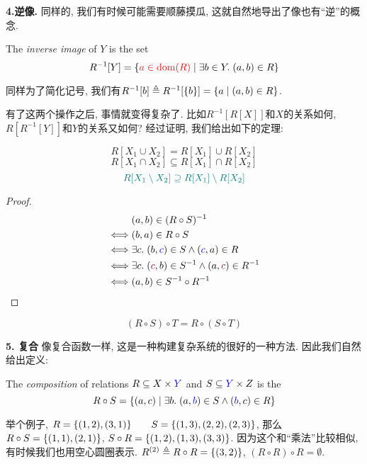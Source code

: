 \textbf{4.逆像. } 同样的, 我们有时候可能需要顺藤摸瓜, 这就自然地导出了像也有``逆''的概念. 

\begin{definition}
  The {\it inverse image} of $Y$  is the set
  \[
    R^{-1}[Y] = \{\textcolor{red}{a \in \text{dom}(R)} \mid \exists b \in Y.\; (a, b) \in R\}
  \]
\end{definition}
同样为了简化记号, 我们有$R^{-1}[b] \triangleq R^{-1}[\{b\}] = \{a \mid (a, b) \in R\}$. 

有了这两个操作之后, 事情就变得复杂了. 比如$R^{-1}[R[X]] $和$ X$的关系如何, $R[R^{-1}[Y]]$和$Y$的关系又如何? 经过证明, 我们给出如下的定理: 
  
\begin{theorem}
  \[
    R[X_1 \cup X_2] = R[X_1] \cup R[X_2]
  \]
  \[
    R[X_1 \cap X_2] \subseteq R[X_1] \cap R[X_2]
  \]
  \[
    \textcolor{teal}{R[X_1 \setminus X_2] \supseteq R[X_1] \setminus R[X_2]}
  \]
\end{theorem}
\begin{proof}
  \setcounter{equation}{0}
  \begin{align}
    &(a, b) \in (R \circ S)^{-1} \\
    \iff& (b, a) \in R \circ S \\
    \iff& \exists c.\; (b, \textcolor{blue}{c}) \in S \land (\textcolor{blue}{c}, a) \in R \\
    \iff& \exists c.\; (\textcolor{purple}{c}, b) \in S^{-1} \land (a, \textcolor{purple}{c}) \in R^{-1} \\
    \iff& (a, b) \in S^{-1} \circ R^{-1}
  \end{align}
\end{proof}
\begin{theorem}
  \[
    (R \circ S) \circ T = R \circ (S \circ T)
  \]
\end{theorem}

\textbf{5. 复合} 像复合函数一样, 这是一种构建复杂系统的很好的一种方法. 因此我们自然给出定义: 
\begin{definition}
  The {\it composition} of relations $R \subseteq X \times \textcolor{blue}{Y}$
  and $S \subseteq \textcolor{blue}{Y} \times Z$ is the 
  \[
    R \circ S = \{(a, c) \mid \exists b.\; (a, \textcolor{blue}{b}) \in S \land (\textcolor{blue}{b}, c) \in R\}
  \]
\end{definition}

举个例子, $R = \{(1, 2), (3, 1)\} \qquad S = \{(1, 3), (2, 2), (2, 3)\}$, 那么$R \circ S = \{(1, 1), (2, 1)\}$, $S \circ R = \{(1, 2), (1, 3), (3, 3)\}$. 因为这个和``乘法''比较相似, 有时候我们也用空心圆圈表示. $R^{(2)} \triangleq R \circ R = \{(3, 2)\}$, $ (R \circ R) \circ R =  \emptyset$. 

